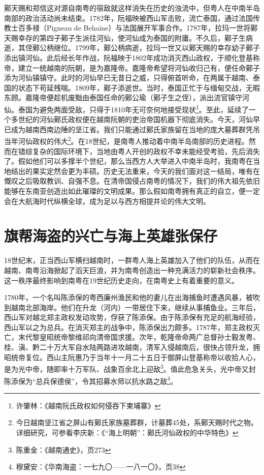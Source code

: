 鄚天赐和郑信这对源自南粤的宿敌就这样消失在历史的浊流中，但粤人在中南半岛南部的政治活动尚未结束。1782年，阮福映被西山军击败，流亡泰国，通过法国传教士百多禄（Pigneau de Behaine）与法国展开军事合作。1787年，拉玛一世将鄚天赐幸存的第四子鄚子生派往河仙，使河仙成为泰国的附庸。不久后，鄚子生病逝，其侄鄚公柄继位。1799年，鄚公柄病逝，拉玛一世又以鄚天赐的幸存幼子鄚子添出镇河仙。此后经长年作战，阮福映于1802年成功消灭西山政权，于顺化登基称帝，建立一统越南的阮朝，是为嘉隆帝。嘉隆帝希望将河仙收归己有，便任命鄚子添为河仙镇镇守。此时的河仙早已无昔日之威，只得俯首听命，在两属于越南、泰国的状态下苟延残喘。1809年，鄚子添逝世。当时，泰国正忙于与缅甸交战，无暇东顾。嘉隆帝便趁机废黜由泰国任命的鄚公瑜（鄚子生之侄），派出流官镇守河仙。泰国为避免两面受敌，只得于1810年无可奈何地接受现状\footnote{许肇林：《越南阮氏政权如何侵吞下柬埔寨》}。至此，延续了一个多世纪的河仙鄚氏政权便在越南阮朝的吏治帝国机器下彻底消失。今天，河仙早已成为越南西南边陲的坚江省。我们只能通过鄚氏家族留在当地的庞大墓葬群凭吊当年河仙政权的伟大\footnote{今日越南坚江省之屏山有鄚氏家族墓葬群，计墓葬45处，系鄚天赐时代之物。详细研究，可参看李庆新：《“海上明朝”：鄚氏河仙政权的中华特色》}。在18世纪，是南粤人推动着中南半岛南部的历史进程。然而在错综复杂的国际环境下，当地由粤人开创的政权不幸未能经受考验，先后消失了。假如他们可以多撑半个世纪，那么当西方人大举进入中南半岛时，我南粤在当地结出的果实定然会更为丰硕。历史无法重来，今天的我们面对这一结局，唯有在慨叹之后吸取教训、自强不息。在清帝国侵占南粤的情况下，我们的伟大祖先依旧能够在东南亚创造出如此璀璨的文明成果。那么假如南粤拥有真正的自立，便一定会在大航海时代纵横全球，成为足以与西方相提并论的伟大文明。

\section{旗帮海盗的兴亡与海上英雄张保仔}

18世纪末，正当西山军横扫越南时，一群粤人海上英雄加入了他们的队伍，从而在越南、南粤沿海掀起了滔天巨浪，并为南粤创造出一种充满活力的崭新社会秩序。这一秩序最终影响到南粤在19世纪历史走向，在南粤史上有着重要的意义。

1780年，一个名叫陈添保的粤西廉州渔民和他的妻儿在出海捕鱼时遭遇风暴，被吹到越南北部海岸。他们在升龙（河内）一带居住下来，继续从事捕鱼业。三年后，西山军对越北郑主政权发动攻势，俘获了陈添保。由于陈添保有充足的航海经验，西山军以之为总兵。在消灭郑主的战争中，陈添保出力颇多。1787年，郑主政权灭亡，末代黎皇昭统帝黎维祁向清帝国求援。次年，乾隆帝命两广总督孙士毅发粤、桂、滇、黔二十万大军自水陆两路进攻越南，清军入侵越南后，很快占领升龙，拥昭统帝复位。西山主阮惠乃于当年十一月二十五日于御屏山登基称帝以收拾人心，是为光中帝，随即率十万军队、战象百余北上迎敌\footnote{陈重金：《越南通史》，页273}。值此危急关头，光中帝又封陈添保为“总兵保德侯”，令其招募水师以抗水路之敌\footnote{穆黛安：《华南海盗：一七九〇——一八一〇》，页38}。

